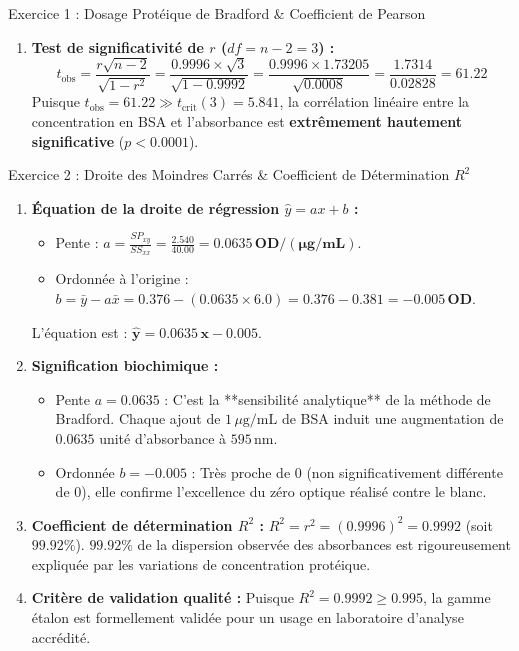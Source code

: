 \documentclass[11pt,a4paper]{article}
\begin{document}
\begin{solutionbox}{Exercice 1 : Dosage Protéique de Bradford \& Coefficient de Pearson}
\begin{enumerate}[label=\textbf{\alph*.}]
  \item \textbf{Test de significativité de $r$ ($df = n - 2 = 3$) :}
  \begin{equation*}
    t_{\text{obs}} = \frac{r \sqrt{n - 2}}{\sqrt{1 - r^2}} = \frac{0.9996 \times \sqrt{3}}{\sqrt{1 - 0.9992}} = \frac{0.9996 \times 1.73205}{\sqrt{0.0008}} = \frac{1.7314}{0.02828} = \mathbf{61.22}
  \end{equation*}
  Puisque $t_{\text{obs}} = 61.22 \gg t_{\text{crit}}(3) = 5.841$, la corrélation linéaire entre la concentration en BSA et l'absorbance est \textbf{extrêmement hautement significative} ($p < 0.0001$).
\end{enumerate}
\end{solutionbox}

\begin{solutionbox}{Exercice 2 : Droite des Moindres Carrés \& Coefficient de Détermination $R^2$}
\begin{enumerate}[label=\textbf{\alph*.}]
  \item \textbf{Équation de la droite de régression $\hat{y} = ax + b$ :}
  \begin{itemize}
    \item Pente : $a = \frac{SP_{xy}}{SS_{xx}} = \frac{2.540}{40.00} = \mathbf{0.0635\,\text{OD}/(\mu\text{g/mL})}$.
    \item Ordonnée à l'origine : $b = \bar{y} - a \bar{x} = 0.376 - (0.0635 \times 6.0) = 0.376 - 0.381 = \mathbf{-0.005\,\text{OD}}$.
  \end{itemize}
  L'équation est : $\mathbf{\hat{y} = 0.0635 \, x - 0.005}$.

  \item \textbf{Signification biochimique :}
  \begin{itemize}
    \item Pente $a = 0.0635$ : C'est la **sensibilité analytique** de la méthode de Bradford. Chaque ajout de $1\,\mu\text{g/mL}$ de BSA induit une augmentation de $0.0635$ unité d'absorbance à $595\,\text{nm}$.
    \item Ordonnée $b = -0.005$ : Très proche de 0 (non significativement différente de 0), elle confirme l'excellence du zéro optique réalisé contre le blanc.
  \end{itemize}

  \item \textbf{Coefficient de détermination $R^2$ :}
  $R^2 = r^2 = (0.9996)^2 = \mathbf{0.9992}$ (soit $\mathbf{99.92\%}$).
  $99.92\%$ de la dispersion observée des absorbances est rigoureusement expliquée par les variations de concentration protéique.

  \item \textbf{Critère de validation qualité :}
  Puisque $R^2 = 0.9992 \ge 0.995$, la gamme étalon est formellement validée pour un usage en laboratoire d'analyse accrédité.
\end{enumerate}
\end{solutionbox}
\end{document}
